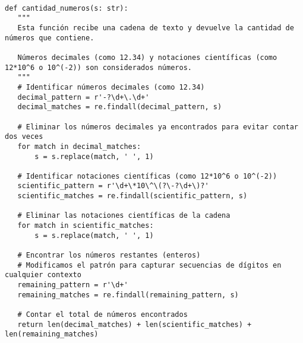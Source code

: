 \begin{lstlisting}[captionpos=b,caption={Solución que incluye números decimales y notaciones científicas}]
      
def cantidad_numeros(s: str):
   """
   Esta función recibe una cadena de texto y devuelve la cantidad de números que contiene.
   
   Números decimales (como 12.34) y notaciones científicas (como 12*10^6 o 10^(-2)) son considerados números.
   """
   # Identificar números decimales (como 12.34)
   decimal_pattern = r'-?\d+\.\d+'
   decimal_matches = re.findall(decimal_pattern, s)
   
   # Eliminar los números decimales ya encontrados para evitar contar dos veces
   for match in decimal_matches:
       s = s.replace(match, ' ', 1)
   
   # Identificar notaciones científicas (como 12*10^6 o 10^(-2))
   scientific_pattern = r'\d+\*10\^\(?\-?\d+\)?'
   scientific_matches = re.findall(scientific_pattern, s)
   
   # Eliminar las notaciones científicas de la cadena
   for match in scientific_matches:
       s = s.replace(match, ' ', 1)
   
   # Encontrar los números restantes (enteros)
   # Modificamos el patrón para capturar secuencias de dígitos en cualquier contexto
   remaining_pattern = r'\d+'
   remaining_matches = re.findall(remaining_pattern, s)
   
   # Contar el total de números encontrados
   return len(decimal_matches) + len(scientific_matches) + len(remaining_matches)
\end{lstlisting}

